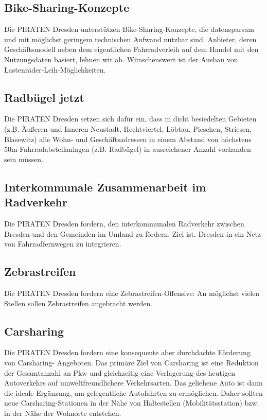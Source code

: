 \documentclass[a4paper, 11pt]{article}
\begin{document}
\subsection{Bike-Sharing-Konzepte}
Die PIRATEN Dresden unterstützen Bike-Sharing-Konzepte, die datensparsam und mit möglichst geringem technischen Aufwand nutzbar sind. Anbieter, deren Geschäftsmodell neben dem eigentlichen Fahrradverleih auf dem Handel mit den Nutzungsdaten basiert, lehnen wir ab. Wünschenswert ist der Ausbau von Lastenräder-Leih-Möglichkeiten.



\subsection{Radbügel jetzt}
Die PIRATEN Dresden setzen sich dafür ein, dass in dicht besiedelten Gebieten (z.B. Äußeren und Inneren Neustadt, Hechtviertel, Löbtau, Pieschen, Striesen, Blasewitz) alle Wohn- und Geschäftsadressen in einem Abstand von höchstens 50m Fahrradabstellanlagen (z.B. Radbügel) in ausreichener Anzahl vorhanden sein müssen.


\subsection{Interkommunale Zusammenarbeit im Radverkehr}
Die PIRATEN Dresden fordern, den interkommunalen Radverkehr zwischen Dresden und den Gemeinden im Umland zu fördern. Ziel ist, Dresden in ein Netz von Fahrradfernwegen zu integrieren.


\subsection{Zebrastreifen}
Die PIRATEN Dresden fordern eine Zebrastreifen-Offensive: An möglichst vielen Stellen sollen Zebrastreifen angebracht werden.


\subsection{Carsharing}
Die PIRATEN Dresden fordern eine konsequente aber durchdachte Förderung von Carsharing- Angeboten. Das primäre Ziel von Carsharing ist eine Reduktion der Gesamtanzahl an Pkw und gleichzeitig eine Verlagerung des heutigen Autoverkehrs auf umweltfreundlichere Verkehrsarten. Das geliehene Auto ist dann die ideale Ergänzung, um gelegentliche Autofahrten zu ermöglichen. Daher sollten neue Carsharing-Stationen in der Nähe von Haltestellen (Mobilitätsstation) bzw. in der Nähe der Wohnorte entstehen.\newline
\end{document}
